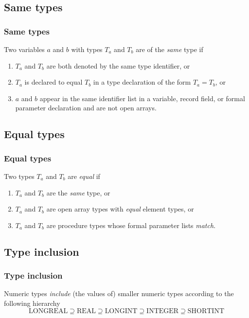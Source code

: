\ifonline
\subsection{Same types}
\else
\subsubsection{Same types}
\fi

Two variables $a$ and $b$ with types $T_a$ and $T_b$ are of
the {\em same} type if
\begin{enumerate}
\item
$T_a$ and $T_b$ are both denoted by the same type identifier,
or
\item
$T_a$ is declared to equal $T_b$ in a type declaration
of the form $T_a = T_b$, or
\item
$a$ and $b$ appear in the same identifier list in a
variable, record field, or formal parameter declaration and are not
open arrays.
\end{enumerate}

\ifonline
\subsection{Equal types}
\else
\subsubsection{Equal types}
\fi

Two types $T_a$ and $T_b$ are {\em equal} if
\begin{enumerate}
\item
$T_a$ and $T_b$ are the {\em same} type, or
\item
$T_a$ and $T_b$ are open array types with {\em equal} element types, or
\item
$T_a$ and $T_b$ are procedure types whose formal parameter lists {\em match}.
\end{enumerate}

\ifonline
\subsection{Type inclusion}
\else
\subsubsection{Type inclusion}
\fi

Numeric types {\em include} (the values of) smaller numeric types according
to the following hierarchy
$$
\mbox{LONGREAL} \supseteq
\mbox{REAL} \supseteq
\mbox{LONGINT} \supseteq
\mbox{INTEGER} \supseteq
\mbox{SHORTINT}
$$

